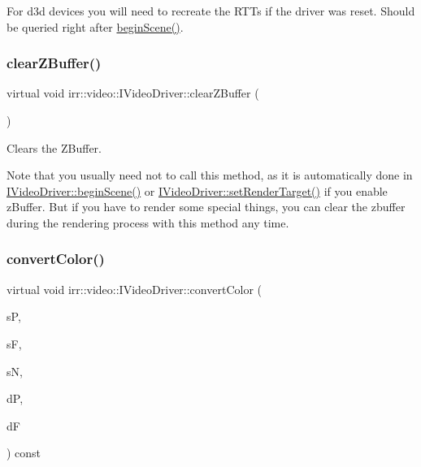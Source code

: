 For d3d devices you will need to recreate the R\+T\+Ts if the driver was reset. Should be queried right after \hyperlink{classirr_1_1video_1_1IVideoDriver_a015b8f2f18c260a00a858181be1e9945}{begin\+Scene()}. \mbox{\label{classirr_1_1video_1_1IVideoDriver_a2036fe0a27dbd1a123ff5aedb07373a5}} 
\subsubsection{\texorpdfstring{clear\+Z\+Buffer()}{clearZBuffer()}}
{\footnotesize\ttfamily virtual void irr\+::video\+::\+I\+Video\+Driver\+::clear\+Z\+Buffer (\begin{DoxyParamCaption}{ }\end{DoxyParamCaption})\hspace{0.3cm}{\ttfamily [pure virtual]}}



Clears the Z\+Buffer. 

Note that you usually need not to call this method, as it is automatically done in \hyperlink{classirr_1_1video_1_1IVideoDriver_a015b8f2f18c260a00a858181be1e9945}{I\+Video\+Driver\+::begin\+Scene()} or \hyperlink{classirr_1_1video_1_1IVideoDriver_a8c38a8d8d6d49be53bda55eb0749e7eb}{I\+Video\+Driver\+::set\+Render\+Target()} if you enable z\+Buffer. But if you have to render some special things, you can clear the zbuffer during the rendering process with this method any time. \mbox{\label{classirr_1_1video_1_1IVideoDriver_afb541967dbb2def61997f1d69f68d5d1}} 
\subsubsection{\texorpdfstring{convert\+Color()}{convertColor()}}
{\footnotesize\ttfamily virtual void irr\+::video\+::\+I\+Video\+Driver\+::convert\+Color (\begin{DoxyParamCaption}\item[{const void $\ast$}]{sP,  }\item[{\hyperlink{namespaceirr_1_1video_a1d5e487888c32b1674a8f75116d829ed}{E\+C\+O\+L\+O\+R\+\_\+\+F\+O\+R\+M\+AT}}]{sF,  }\item[{\hyperlink{namespaceirr_ac66849b7a6ed16e30ebede579f9b47c6}{s32}}]{sN,  }\item[{void $\ast$}]{dP,  }\item[{\hyperlink{namespaceirr_1_1video_a1d5e487888c32b1674a8f75116d829ed}{E\+C\+O\+L\+O\+R\+\_\+\+F\+O\+R\+M\+AT}}]{dF }\end{DoxyParamCaption}) const\hspace{0.3cm}{\ttfamily [pure virtual]}}



